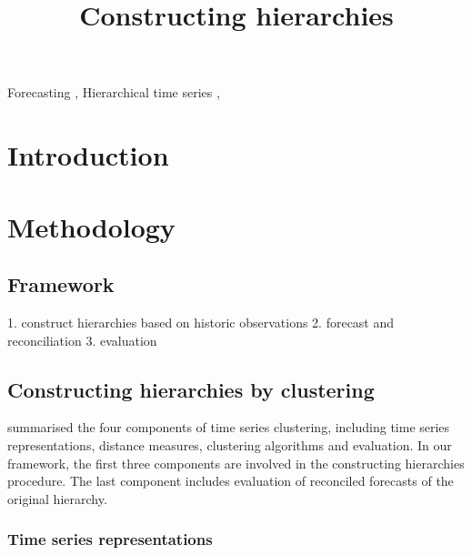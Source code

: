 \documentclass[a4paper,review,12pt,authoryear]{elsarticle}
\begin{document}
\begin{frontmatter}

  \title{Constructing hierarchies}


  \begin{abstract}

    

  \end{abstract}

  \begin{keyword}
  Forecasting \sep
  Hierarchical time series \sep
  
  \end{keyword}

\end{frontmatter}

\newpage

\section{Introduction}


\section{Methodology}
\label{sec:method}

\subsection{Framework}

1. construct hierarchies based on historic observations
2. forecast and reconciliation
3. evaluation

\subsection{Constructing hierarchies by clustering}

\cite{aghabozorgiTimeseriesClusteringDecade2015a} summarised the four components of time series clustering, including time series representations, distance measures, clustering algorithms and evaluation. In our framework, the first three components are involved in the constructing hierarchies procedure. The last component includes evaluation of reconciled forecasts of the original hierarchy.

\subsubsection*{Time series representations}
\end{document}
